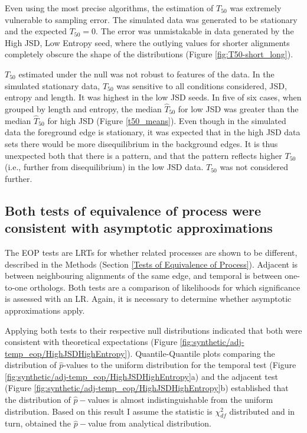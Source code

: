 Even using the most precise algorithms, the estimation of $T_{50}$ was extremely vulnerable to sampling error. The simulated data was generated to be stationary and the expected $T_{50} = 0$. The error was unmistakable in data generated by the High JSD, Low Entropy seed, where the outlying values for shorter alignments completely obscure the shape of the distributions (Figure \ref{fig:T50-short_long}). 



$T_{50}$ estimated under the null was not robust to features of the data. In the simulated stationary data, $T_{50}$ was sensitive to all conditions considered, JSD, entropy and length. It was highest in the low JSD seeds. In five of six cases, when grouped by length and entropy, the median $\hat T_{50}$ for low JSD was greater than the median $\hat T_{50}$ for high JSD (Figure \ref{t50_means}). Even though in the simulated data the foreground edge is stationary, it was expected that in the high JSD data sets there would be more disequilibrium in the background edges. It is thus unexpected both that there is a pattern, and that the pattern reflects higher $T_{50}$ (i.e., further from disequilibrium) in the low JSD data. $T_{50}$ was not considered further. 



\subsection{Both tests of equivalence of process were consistent with asymptotic approximations}

The EOP tests are LRTs for whether related processes are shown to be different, described in the Methods (Section \ref{Tests of Equivalence of Process}). Adjacent is between neighbouring alignments of the same edge, and temporal is between one-to-one orthologs. Both tests are a comparison of likelihoods for which significance is assessed with an LR. Again, it is necessary to determine whether asymptotic approximations apply. 

Applying both tests to their respective null distributions indicated that both were consistent with theoretical expectations (Figure \ref{fig:synthetic/adj-temp_eop/HighJSDHighEntropy}). Quantile-Quantile plots comparing the distribution of $\hat p$-values to the uniform distribution for the temporal test (Figure \ref{fig:synthetic/adj-temp_eop/HighJSDHighEntropy}a) and the adjacent test (Figure \ref{fig:synthetic/adj-temp_eop/HighJSDHighEntropy}b) established that the distribution of $\hat p-$values is almost indistinguishable from the uniform distribution. Based on this result I assume the statistic is $\chi^2_{df}$ distributed and in turn, obtained the $\hat p-$value from analytical distribution. 

